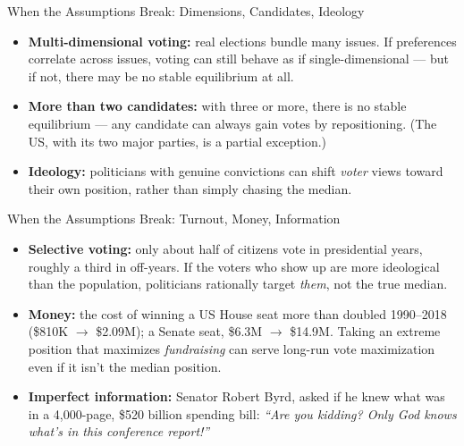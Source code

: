 \documentclass[11pt,aspectratio=169]{beamer}
\begin{document}
\begin{frame}{When the Assumptions Break: Dimensions, Candidates, Ideology}
  \small
  \begin{itemize}
    \item \textbf{Multi-dimensional voting:} real elections bundle many issues. If preferences correlate across issues, voting can still behave as if single-dimensional --- but if not, there may be no stable equilibrium at all.
    \item \textbf{More than two candidates:} with three or more, there is no stable equilibrium --- any candidate can always gain votes by repositioning. (The US, with its two major parties, is a partial exception.)
    \item \textbf{Ideology:} politicians with genuine convictions can shift \emph{voter} views toward their own position, rather than simply chasing the median.
  \end{itemize}
\end{frame}

\begin{frame}{When the Assumptions Break: Turnout, Money, Information}
  \small
  \begin{itemize}
    \item \textbf{Selective voting:} only about half of citizens vote in presidential years, roughly a third in off-years. If the voters who show up are more ideological than the population, politicians rationally target \emph{them}, not the true median.
    \item \textbf{Money:} the cost of winning a US House seat more than doubled 1990--2018 (\$810K $\to$ \$2.09M); a Senate seat, \$6.3M $\to$ \$14.9M. Taking an extreme position that maximizes \emph{fundraising} can serve long-run vote maximization even if it isn't the median position.
    \item \textbf{Imperfect information:} Senator Robert Byrd, asked if he knew what was in a 4,000-page, \$520 billion spending bill: \emph{``Are you kidding? Only God knows what's in this conference report!''}
  \end{itemize}
\end{frame}
\end{document}

